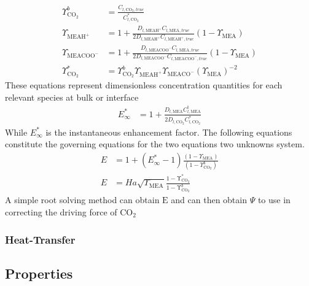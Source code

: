 \documentclass[12pt, letterpaper]{article}
\begin{document}
                \begin{align}
                    \Upsilon_{\mathrm{CO}_2}^b &= \frac{C_{l, \mathrm{CO}_2, true}}{C_{l, \mathrm{CO}_2}^*} \\
                    \Upsilon_{\mathrm{MEAH}^{+}} &= 1+\frac{D_{l, \mathrm{MEAH}^{+}} C_{l,\mathrm{MEA}, true}}{2 D_{l, \mathrm{MEAH}^{+}} C_{l, \mathrm{MEAH}^{+}, true}}\left(1-\Upsilon_{\mathrm{MEA}}\right) \\
                    \Upsilon_{\mathrm{MEACOO}^{-}} &= 1+\frac{D_{l, \mathrm{MEACOO}^{-}} C_{l,\mathrm{MEA}, true}}{2 D_{l, \mathrm{MEACOO}^{-}} C_{l, \mathrm{MEACOO}^{-}, true}}\left(1-\Upsilon_{\mathrm{MEA}}\right) \\
                    \Upsilon_{\mathrm{CO}_2}^* &= \Upsilon_{\mathrm{CO}_2}^b \Upsilon_{\mathrm{MEAH}^{+}} \Upsilon_{\mathrm{MEACO}^-}\left(\Upsilon_{\mathrm{MEA}}\right)^{-2}
                \end{align}
                These equations represent dimensionless concentration quantities for each relevant species at bulk or interface
                \begin{align}
                    E_{\infty}^* &= 1+\frac{D_{l,\mathrm{MEA}} C_{l, \mathrm{MEA}}^{\mathrm{t}}}{2 D_{l, \mathrm{CO}_2} C_{l, \mathrm{CO}_2}^*}
                \end{align}
                While $E_{\infty}^*$ is the instantaneous enhancement factor.
                The following equations constitute the governing equations for the two equations two unknowns system.
                \begin{align}
                    E &= 1+\left(E_{\infty}^*-1\right) \frac{\left(1-\Upsilon_{\mathrm{MEA}}\right)}{\left(1-\Upsilon_{\mathrm{CO}_2}^b\right)} \\
                    E &= Ha \sqrt{\Upsilon_{\mathrm{MEA}}} \frac{1-\mathrm{\Upsilon}_{\mathrm{CO}_2}^*}{1-\mathrm{\Upsilon}_{\mathrm{CO}_2}^b}
                \end{align}
                A simple root solving method can obtain $\mathrm{E}$ and can then obtain $\Psi$ to use in correcting the driving force of $\mathrm{CO_2}$
            
        \subsubsection{Heat-Transfer}
        
    
        \subsection{Properties}\label{subsec:properties}
                
\end{document}
